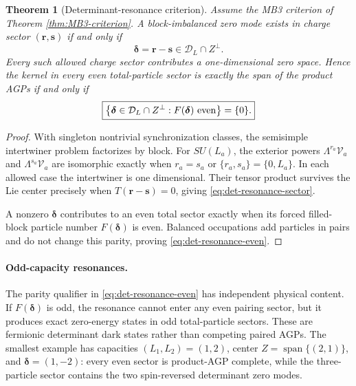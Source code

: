 \documentclass[11pt]{article}
\numberwithin{equation}{section}
\newtheorem{theorem}{Theorem}[section]
\newcommand{\Span}{\operatorname{span}}
\newcommand{\cV}{\mathcal V}
\begin{document}
\begin{theorem}[Determinant-resonance criterion]
\label{thm:det-resonance}
Assume the MB3 criterion of Theorem \ref{thm:MB3-criterion}.  A block-imbalanced zero mode exists in charge sector $(\mathbf r,\mathbf s)$ if and only if
\begin{equation}
 \boldsymbol\delta=\mathbf r-\mathbf s
 \in
 \mathcal D_L\cap Z^\perp.
 \label{eq:det-resonance-sector}
\end{equation}
Every such allowed charge sector contributes a one-dimensional zero space.  Hence the kernel in every even total-particle sector is exactly the span of the product AGPs if and only if
\begin{equation}
 \boxed{
 \left\{
 \boldsymbol\delta\in\mathcal D_L\cap Z^\perp:
 F(\boldsymbol\delta)\ {\rm even}
 \right\}
 =
 \{0\}.}
 \label{eq:det-resonance-even}
\end{equation}
\end{theorem}

\begin{proof}
With singleton nontrivial synchronization classes, the semisimple intertwiner problem factorizes by block.  For $SU(L_a)$, the exterior powers $\Lambda^{r_a}\cV_a$ and $\Lambda^{s_a}\cV_a$ are isomorphic exactly when $r_a=s_a$ or $\{r_a,s_a\}=\{0,L_a\}$.  In each allowed case the intertwiner is one dimensional.  Their tensor product survives the Lie center precisely when $T(\mathbf r-\mathbf s)=0$, giving \eqref{eq:det-resonance-sector}.

A nonzero $\boldsymbol\delta$ contributes to an even total sector exactly when its forced filled-block particle number $F(\boldsymbol\delta)$ is even.  Balanced occupations add particles in pairs and do not change this parity, proving \eqref{eq:det-resonance-even}.
\end{proof}

\paragraph{Odd-capacity resonances.}
The parity qualifier in \eqref{eq:det-resonance-even} has independent physical content.  If $F(\boldsymbol\delta)$ is odd, the resonance cannot enter any even pairing sector, but it produces exact zero-energy states in odd total-particle sectors.  These are fermionic determinant dark states rather than competing paired AGPs.  The smallest example has capacities $(L_1,L_2)=(1,2)$, center $Z=\Span\{(2,1)\}$, and $\boldsymbol\delta=(1,-2)$: every even sector is product-AGP complete, while the three-particle sector contains the two spin-reversed determinant zero modes.
\end{document}
